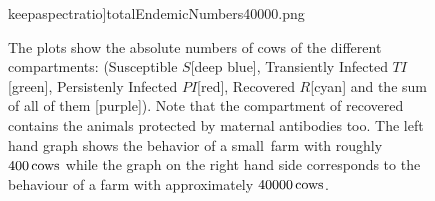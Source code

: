\begin{figure}[htbp]
\begin{minipage}{0.5\textwidth}
keepaspectratio]{totalEndemicNumbers40000.png} 
\end{minipage}
\caption[Absolute Numbers Of Compartments In Different Farm Sizes]{The plots show the absolute numbers of cows of the different compartments: (Susceptible $S$[deep blue], Transiently Infected $TI$[green], Persistenly Infected $PI$[red], Recovered $R$[cyan] and the sum of all of them [purple]). Note that the compartment of recovered contains the animals protected by maternal antibodies too\protect\footnotemark. The left hand graph shows the behavior of a \glqq small\grqq\ farm with roughly $400\,\text{cows}$ while the graph on the right hand side corresponds to the behaviour of a farm with approximately $40000\,\text{cows}$.}
\label{fig:absoluteNumbersCompartmentsDifferentFarmSizes}
\end{figure} 

